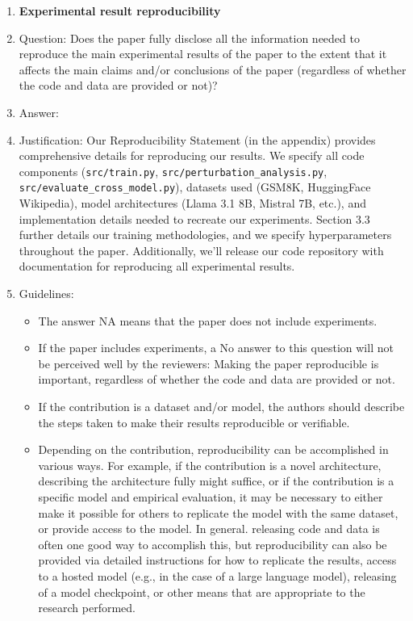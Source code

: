 \documentclass{article}
\begin{document}
\begin{enumerate}
    \item {\bf Experimental result reproducibility}
    \item[] Question: Does the paper fully disclose all the information needed to reproduce the main experimental results of the paper to the extent that it affects the main claims and/or conclusions of the paper (regardless of whether the code and data are provided or not)?
    \item[] Answer: \answerYes{} %
    \item[] Justification: Our Reproducibility Statement (in the appendix) provides comprehensive details for reproducing our results. We specify all code components (\texttt{src/train.py}, \texttt{src/perturbation\_analysis.py}, \texttt{src/evaluate\_cross\_model.py}), datasets used (GSM8K, HuggingFace Wikipedia), model architectures (Llama 3.1 8B, Mistral 7B, etc.), and implementation details needed to recreate our experiments. Section 3.3 further details our training methodologies, and we specify hyperparameters throughout the paper. Additionally, we'll release our code repository with documentation for reproducing all experimental results.
    \item[] Guidelines:
    \begin{itemize}
        \item The answer NA means that the paper does not include experiments.
        \item If the paper includes experiments, a No answer to this question will not be perceived well by the reviewers: Making the paper reproducible is important, regardless of whether the code and data are provided or not.
        \item If the contribution is a dataset and/or model, the authors should describe the steps taken to make their results reproducible or verifiable. 
        \item Depending on the contribution, reproducibility can be accomplished in various ways. For example, if the contribution is a novel architecture, describing the architecture fully might suffice, or if the contribution is a specific model and empirical evaluation, it may be necessary to either make it possible for others to replicate the model with the same dataset, or provide access to the model. In general. releasing code and data is often one good way to accomplish this, but reproducibility can also be provided via detailed instructions for how to replicate the results, access to a hosted model (e.g., in the case of a large language model), releasing of a model checkpoint, or other means that are appropriate to the research performed.

\end{itemize}
\end{enumerate}
\end{document}
